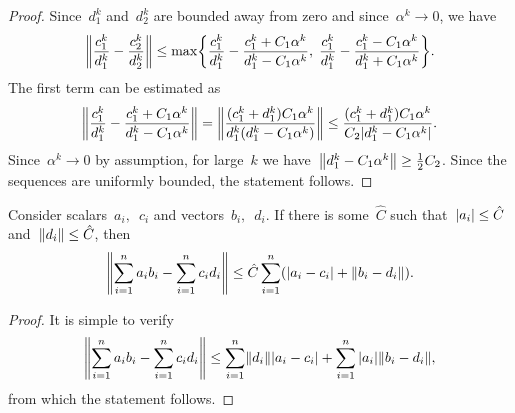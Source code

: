 \begin{proof}
  Since~$d_1^k$ and~$d_2^k$ are bounded away from zero and since~$\alpha^k \to 0$, we have
  \begin{equation*}
    \norm{\frac{c_1^k}{d_1^k} - \frac{c_2^k}{d_2^k}}
      \leq \max\Brac[c]{\frac{c_1^k}{d_1^k} - \frac{c_1^k+C_1\alpha^k}{d_1^k-C_1\alpha^k}, \; \frac{c_1^k}{d_1^k} - \frac{c_1^k-C_1\alpha^k}{d_1^k+C_1\alpha^k}}.
  \end{equation*}
  The first term can be estimated as
  \begin{equation*}
    \norm{\frac{c_1^k}{d_1^k} - \frac{c_1^k+C_1\alpha^k}{d_1^k-C_1\alpha^k}}
    = \norm{\frac{(c_1^k+d_1^k)C_1\alpha^k}{d_1^k(d_1^k-C_1\alpha^k)}}
    \leq \frac{(c_1^k+d_1^k)C_1\alpha^k}{C_2|d_1^k-C_1\alpha^k|}.
  \end{equation*}
  Since~$\alpha^k\to 0$ by assumption, for large~$k$ we have~$\norm{d_1^k-C_1\alpha^k}\geq \frac{1}{2}C_2$. Since the sequences are uniformly bounded, the statement follows.
\end{proof}

\pagebreak

\begin{lemma}\label{lemma:product}
  Consider scalars~$a_i,$~$c_i$ and vectors~$b_i,$~$d_i.$ If there is some~$\hat{C}$ such that~$|a_i| \leq \hat{C}$ and~$\norm{d_i} \leq \hat{C}$, then
  \begin{equation*}
    \norm{\sum_{i=1}^n a_ib_i - \sum_{i=1}^n c_id_i}
      \leq \hat{C}\sum_{i=1}^n \Brac{\abs{a_i-c_i} + \norm{b_i-d_i}}.
  \end{equation*}
\end{lemma}

\begin{proof}
  It is simple to verify
  \begin{equation*}
    \norm{\sum_{i=1}^n a_ib_i - \sum_{i=1}^n c_id_i} \leq \sum_{i=1}^n \norm{d_i}\abs{a_i-c_i} + \sum_{i=1}^n \abs{a_i}\norm{b_i-d_i},
  \end{equation*}
  from which the statement follows.
\end{proof}

\newpage
